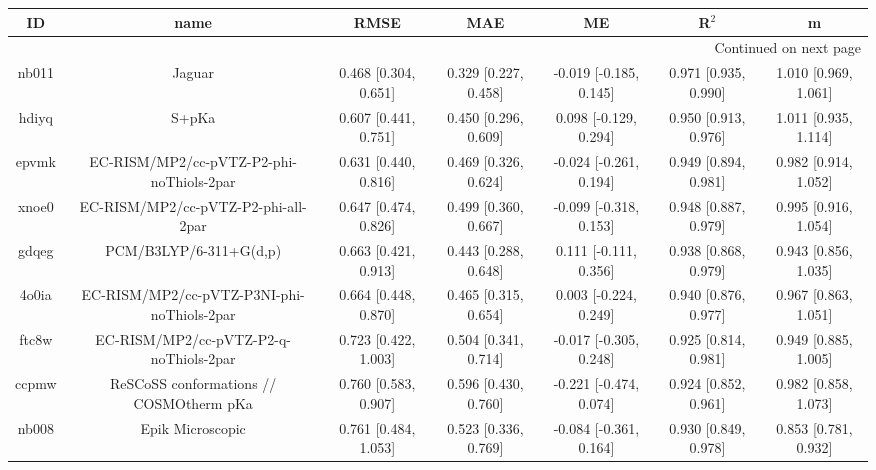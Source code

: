 \documentclass{article}
\begin{document}
\begin{center}
\begin{longtable}{|ccccccc|}
\toprule
    ID &                                               name &                  RMSE &                   MAE &                       ME &                 R$^2$ &                      m \\
\midrule
\endhead
\midrule
\multicolumn{7}{r}{{Continued on next page}} \\
\midrule
\endfoot

\bottomrule
\endlastfoot
 nb011 &                                             Jaguar &  0.468 [0.304, 0.651] &  0.329 [0.227, 0.458] &   -0.019 [-0.185, 0.145] &  0.971 [0.935, 0.990] &   1.010 [0.969, 1.061] \\
 hdiyq &                                              S+pKa &  0.607 [0.441, 0.751] &  0.450 [0.296, 0.609] &    0.098 [-0.129, 0.294] &  0.950 [0.913, 0.976] &   1.011 [0.935, 1.114] \\
 epvmk &           EC-RISM/MP2/cc-pVTZ-P2-phi-noThiols-2par &  0.631 [0.440, 0.816] &  0.469 [0.326, 0.624] &   -0.024 [-0.261, 0.194] &  0.949 [0.894, 0.981] &   0.982 [0.914, 1.052] \\
 xnoe0 &                EC-RISM/MP2/cc-pVTZ-P2-phi-all-2par &  0.647 [0.474, 0.826] &  0.499 [0.360, 0.667] &   -0.099 [-0.318, 0.153] &  0.948 [0.887, 0.979] &   0.995 [0.916, 1.054] \\
 gdqeg &                             PCM/B3LYP/6-311+G(d,p) &  0.663 [0.421, 0.913] &  0.443 [0.288, 0.648] &    0.111 [-0.111, 0.356] &  0.938 [0.868, 0.979] &   0.943 [0.856, 1.035] \\
 4o0ia &         EC-RISM/MP2/cc-pVTZ-P3NI-phi-noThiols-2par &  0.664 [0.448, 0.870] &  0.465 [0.315, 0.654] &    0.003 [-0.224, 0.249] &  0.940 [0.876, 0.977] &   0.967 [0.863, 1.051] \\
 ftc8w &             EC-RISM/MP2/cc-pVTZ-P2-q-noThiols-2par &  0.723 [0.422, 1.003] &  0.504 [0.341, 0.714] &   -0.017 [-0.305, 0.248] &  0.925 [0.814, 0.981] &   0.949 [0.885, 1.005] \\
 ccpmw &            ReSCoSS conformations // COSMOtherm pKa &  0.760 [0.583, 0.907] &  0.596 [0.430, 0.760] &   -0.221 [-0.474, 0.074] &  0.924 [0.852, 0.961] &   0.982 [0.858, 1.073] \\
 nb008 &                                   Epik Microscopic &  0.761 [0.484, 1.053] &  0.523 [0.336, 0.769] &   -0.084 [-0.361, 0.164] &  0.930 [0.849, 0.978] &   0.853 [0.781, 0.932] \\

\end{longtable}
\end{center}
\end{document}
